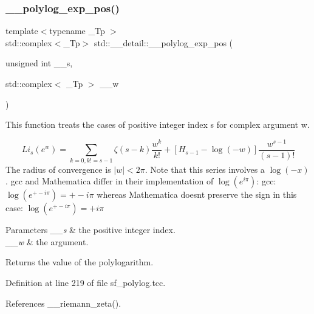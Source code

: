\mbox{\label{namespacestd_1_1____detail_a0327d2970eba3a0a2d73c71c7a77701c}} 
\subsubsection{\texorpdfstring{\+\_\+\+\_\+polylog\+\_\+exp\+\_\+pos()}{\_\_polylog\_exp\_pos()}\hspace{0.1cm}{\footnotesize\ttfamily [1/3]}}
{\footnotesize\ttfamily template$<$typename \+\_\+\+Tp $>$ \\
std\+::complex$<$\+\_\+\+Tp$>$ std\+::\+\_\+\+\_\+detail\+::\+\_\+\+\_\+polylog\+\_\+exp\+\_\+pos (\begin{DoxyParamCaption}\item[{unsigned int}]{\+\_\+\+\_\+s,  }\item[{std\+::complex$<$ \+\_\+\+Tp $>$}]{\+\_\+\+\_\+w }\end{DoxyParamCaption})}

This function treats the cases of positive integer index s for complex argument w.

\[ Li_s(e^w) = \sum_{k=0, k != s-1} \zeta(s-k) \frac{w^k}{k!} + \left[H_{s-1} - \log(-w)\right] \frac{w^{s-1}}{(s-1)!} \] The radius of convergence is $ |w| < 2 \pi $. Note that this series involves a $ \log(-x) $. gcc and Mathematica differ in their implementation of $ \log(e^{i\pi}) $\+: gcc\+: $ \log(e^{+-i\pi}) = +-i\pi $ whereas Mathematica doesn\textquotesingle{}t preserve the sign in this case\+: $ \log(e^{+- i\pi}) = +i \pi $


\begin{DoxyParams}{Parameters}
{\em \+\_\+\+\_\+s} & the positive integer index. \\
\hline
{\em \+\_\+\+\_\+w} & the argument. \\
\hline
\end{DoxyParams}
\begin{DoxyReturn}{Returns}
the value of the polylogarithm. 
\end{DoxyReturn}


Definition at line 219 of file sf\+\_\+polylog.\+tcc.



References \+\_\+\+\_\+riemann\+\_\+zeta().



